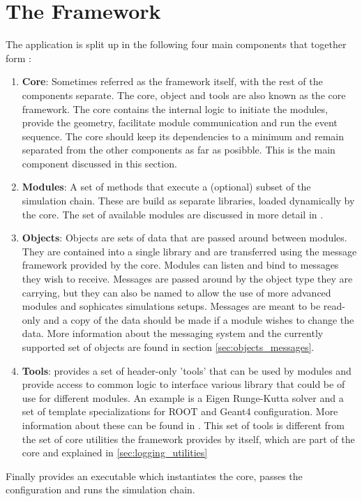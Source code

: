 \section{The \apsq Framework}
\label{sec:framework}
The application is split up in the following four main components that together form \apsq:
\begin{enumerate}
\item \textbf{Core}: Sometimes referred as the framework itself, with the rest of the components separate. The core, object and tools are also known as the core framework. The core contains the internal logic to initiate the modules, provide the geometry, facilitate module communication and run the event sequence. The core should keep its dependencies to a minimum and remain separated from the other components as far as posibble. This is the main component discussed in this section.
\item \textbf{Modules}: A set of methods that execute a (optional) subset of the simulation chain. These are build as separate libraries, loaded dynamically by the core. The set of available modules are discussed in more detail in \needref.
\item \textbf{Objects}: Objects are sets of data that are passed around between modules. They are contained into a single library and are transferred using the message framework provided by the core. Modules can listen and bind to messages they wish to receive. Messages are passed around by the object type they are carrying, but they can also be named to allow the use of more advanced modules and sophicates simulations setups. Messages are meant to be read-only and a copy of the data should be made if a module wishes to change the data. More information about the messaging system and the currently supported set of objects are found in section \ref{sec:objects_messages}.
\item \textbf{Tools}: \apsq provides a set of header-only 'tools' that can be used by modules and provide access to common logic to interface various library that could be of use for different modules. An example is a Eigen Runge-Kutta solver and a set of template specializations for ROOT and Geant4 configuration. More information about these can be found in \needref. This set of tools is different from the set of core utilities the framework provides by itself, which are part of the core and explained in \ref{sec:logging_utilities}
\end{enumerate}
Finally \apsq provides an executable which instantiates the core, passes the configuration and runs the simulation chain.

